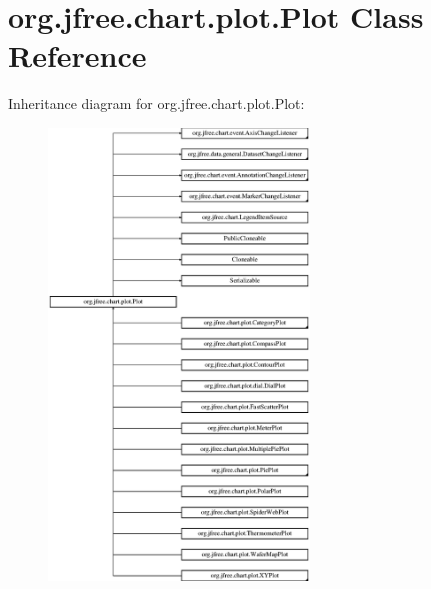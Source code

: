 \hypertarget{classorg_1_1jfree_1_1chart_1_1plot_1_1_plot}{}\section{org.\+jfree.\+chart.\+plot.\+Plot Class Reference}
\label{classorg_1_1jfree_1_1chart_1_1plot_1_1_plot}
Inheritance diagram for org.\+jfree.\+chart.\+plot.\+Plot\+:\begin{figure}[H]
\begin{center}
\leavevmode
\includegraphics[height=12.000000cm]{classorg_1_1jfree_1_1chart_1_1plot_1_1_plot}
\end{center}
\end{figure}
